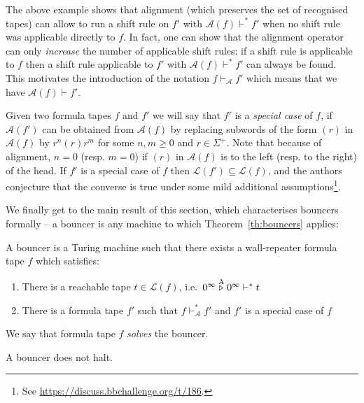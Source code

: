 The above example shows that alignment (which preserves the set of recognised tapes) can allow to run a shift rule on $f'$ with $\mathcal{A}(f) \vdash^* f'$ when no shift rule was applicable directly to $f$. In fact, one can show that the alignment operator can only \textit{increase} the number of applicable shift rules: if a shift rule is applicable to $f$ then a shift rule applicable to $f'$ with $\mathcal{A}(f) \vdash^* f'$ can always be found. This motivates the introduction of the notation $f \vdash_\mathcal{A} f'$ which means that we have $\mathcal{A}(f) \vdash f'$.

Given two formula tapes $f$ and $f'$ we will say that $f'$ is a \textit{special case} of $f$, if $\mathcal{A}(f')$ can be obtained from $\mathcal{A}(f)$ by replacing subwords of the form $(r)$ in $\mathcal{A}(f)$ by $r^n(r)r^m$ for some $n,m\geq 0$ and $r\in\Sigma^+$. Note that because of alignment, $n=0$ (resp. $m=0$) if $(r)$ in $\mathcal{A}(f)$ is to the left (resp. to the right) of the head. If $f'$ is a special case of $f$ then $\mathcal{L}(f') \subseteq \mathcal{L}(f)$, and the authors conjecture that the converse is true under some mild additional assumptions\footnote{See \url{https://discuss.bbchallenge.org/t/186}.}.

We finally get to the main result of this section, which characterises bouncers formally -- a bouncer is any machine to which Theorem~\ref{th:bouncers} applies:

\begin{definition}[Bouncers]\label{def:bouncers}
    A bouncer is a Turing machine such that there exists a wall-repeater formula tape $f$ which satisfies:
    \begin{enumerate}
        \item There is a reachable tape $t\in\mathcal{L}(f)$, i.e.\ $0^\infty \stackrel{\text{A}}\triangleright 0^\infty \vdash^* t$
        \item There is a formula tape $f'$ such that $f \vdash_\mathcal{A}^* f'$ and $f'$ is a special case of $f$
    \end{enumerate}
    We say that formula tape $f$ \textit{solves} the bouncer.
\end{definition}

\begin{theorem}\label{th:bouncers}
    A bouncer does not halt.
\end{theorem}

